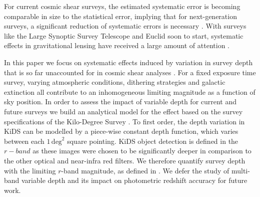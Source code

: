 \documentclass{aa}
\begin{document}

For current cosmic shear surveys, the estimated systematic error is becoming comparable in size to the statistical error, implying that for next-generation surveys, a significant reduction of systematic errors is necessary \citep[][hereafter H17]{2017MNRAS.465.1454H}. With surveys like the Large Synoptic Survey Telescope \citep[LSST,][]{Ivezic:2008} and Euclid \citep{Laureijs:2011} soon to start, systematic effects in gravitational lensing have received a large amount of attention \citep{2018arXiv181002353A,2019arXiv190207439B,2019arXiv190109488S}.

In this paper we focus on systematic effects induced by variation in survey depth that is so far unaccounted for in cosmic shear analyses \citep{Vale:2004}.   For a fixed exposure time survey, varying atmospheric conditions, dithering strategies and galactic extinction all contribute to an inhomogeneous limiting magnitude as a function of sky position.   In order to assess the impact of variable depth for current and future surveys we build an analytical model for the effect based on the survey specifications of the Kilo-Degree Survey \citep[KiDS,][]{Kuijken:2015}.  To first order, the depth variation in KiDS can be modelled by a piece-wise constant depth function, which varies between each $1\,\text{deg}^2$ square pointing.   KiDS object detection is defined in the $r-band$ as these images were chosen to be significantly deeper in comparison to the other optical and near-infra red filters.   We therefore quantify survey depth with the limiting $r$-band magnitude, as defined in \citet{2017A&A...604A.134D}.  We defer the study of multi-band variable depth and its impact on photometric redshift accuracy for future work.
\end{document}
